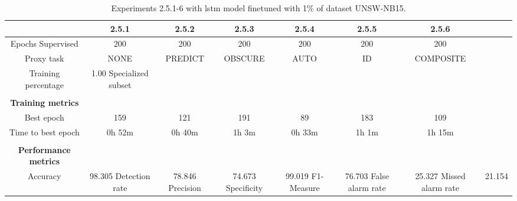 \begin{table}[htb]
    \centering
    \begin{tabular}{@{}ccccccc@{}}
        \toprule
         & 2.5.1 & 2.5.2 & 2.5.3 & 2.5.4 & 2.5.5 & 2.5.6 \\
        \midrule
        Epochs Supervised &  200 &  200 &  200 &  200 &  200 &  200 \\
        Proxy task &  NONE &  PREDICT &  OBSCURE &  AUTO &  ID &  COMPOSITE \\
        Training percentage &  1.00 %
        Specialized subset &   &   &   &   &   &   \\
         \\
        \textbf{Training metrics} &  &  &  &  &  &  \\
        Best epoch &  159 &  121 &  191 &  89 &  183 &  109 \\
        Time to best epoch &  0h 52m &  0h 40m &  1h 3m &  0h 33m &  1h 1m &  1h 15m \\
         \\
        \textbf{Performance metrics} &  &  &  &  &  &  \\
        Accuracy &  98.305 %
        Detection rate &  78.846 %
        Precision &  74.673 %
        Specificity &  99.019 %
        F1-Measure &  76.703 %
        False alarm rate &  25.327 %
        Missed alarm rate &  21.154 %
        \bottomrule
    \end{tabular}
    \caption{Experiments 2.5.1-6 with \gls{lstm} model finetuned with 1\% of dataset UNSW-NB15.}
    \label{table:results:lstm:stats_flows15_10}
\end{table}